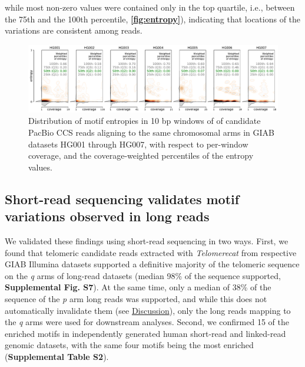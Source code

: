 \documentclass{article}
\begin{document}
        while most non-zero values were contained only in the top quartile,
        i.e., between the 75th and the 100th percentile,
        \textbf{\autoref{fig:entropy}}),
        indicating that locations of the variations are consistent among reads.
        \begin{figure}[h!] \centering
        \includegraphics[height=.75\textheight,width=\textwidth,keepaspectratio]{../figures/Figure_3.pdf}
        \caption{
            \small Distribution of motif entropies in 10 bp windows of of candidate PacBio CCS reads aligning to the same chromosomal arms
            in GIAB datasets HG001 through HG007,
            with respect to per-window coverage,
            and the coverage-weighted percentiles of the entropy values.
        }
        \label{fig:entropy}
        \end{figure}

\subsection*{Short-read sequencing validates motif variations observed in long reads}
    We validated these findings using short-read sequencing in two ways.
    First, we found that telomeric candidate reads extracted with \textit{Telomerecat} \parencite{telomerecat}
        from respective GIAB Illumina datasets
        supported a definitive majority of the telomeric sequence on the \textit{q} arms of long-read datasets
            (median 98\% of the sequence supported, \textbf{Supplemental Fig. S7}).
        At the same time, only a median of 38\% of the sequence of the \textit{p} arm long reads was supported,
            and while this does not automatically invalidate them (see \hyperref[sec:discussion]{Discussion}),
            only the long reads mapping to the \textit{q} arms were used for downstream analyses.
    Second, we confirmed 15 of the enriched motifs in independently generated human short-read and linked-read genomic datasets,
        with the same four motifs being the most enriched (\textbf{Supplemental Table S2}).
\end{document}

